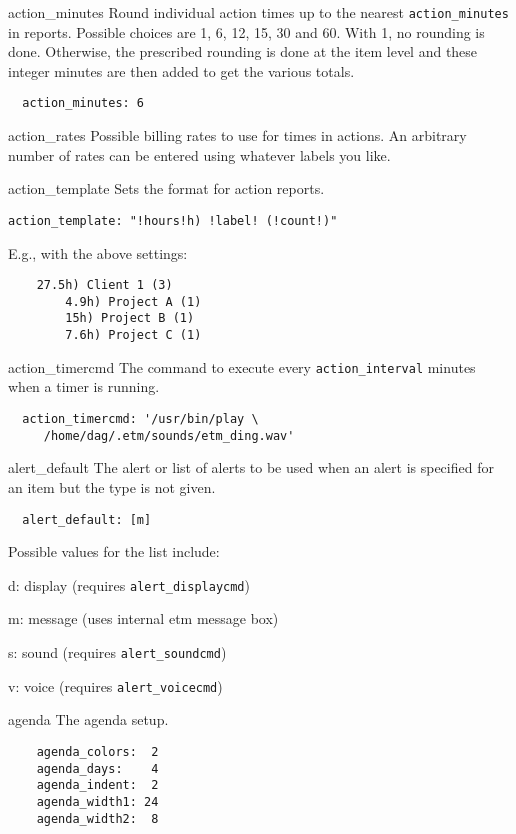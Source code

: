 \documentclass[9pt,landscape]{article}
\begin{document}
\begin{multicols}{3}
\begin{compactdesc}
\item[action\_minutes] Round individual action times up to the nearest \verb!action_minutes! in reports. Possible choices are 1, 6, 12, 15, 30 and 60. With 1, no rounding is done. Otherwise, the prescribed rounding is done at the item level and these integer minutes are then added to get the various totals.
\begin{verbatim}
  action_minutes: 6
\end{verbatim}

\item[action\_rates] Possible billing rates to use for times in actions. An arbitrary number of rates can be entered using whatever labels you like.

\item[action\_template] Sets the format for action reports.
\begin{verbatim}
action_template: "!hours!h) !label! (!count!)"
\end{verbatim}
E.g., with the above settings:
\begin{verbatim}
    27.5h) Client 1 (3)
        4.9h) Project A (1)
        15h) Project B (1)
        7.6h) Project C (1)
\end{verbatim}

\item[action\_timercmd] The command to execute every \verb'action_interval' minutes when a timer is running.
\begin{verbatim}
  action_timercmd: '/usr/bin/play \
     /home/dag/.etm/sounds/etm_ding.wav'
\end{verbatim}

\item[alert\_default] The alert or list of alerts to be used when an alert is specified for an item but the type is not given.
\begin{verbatim}
  alert_default: [m]
\end{verbatim}
Possible values for the list include:
\begin{compactdesc}
\item[d:] display (requires \verb!alert_displaycmd!)
\item[m:] message (uses internal etm message box)
\item[s:] sound (requires \verb!alert_soundcmd!)
\item[v:] voice (requires \verb!alert_voicecmd!)
\end{compactdesc}

\item[agenda] The agenda setup.
\begin{verbatim}
    agenda_colors:  2
    agenda_days:    4
    agenda_indent:  2
    agenda_width1: 24
    agenda_width2:  8
\end{verbatim}


\end{compactdesc}
\end{multicols}
\end{document}
